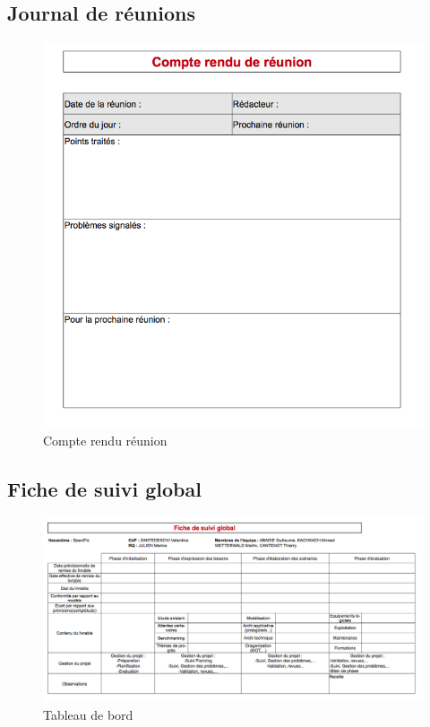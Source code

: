 \subsection{Journal de réunions}
\begin{figure}[h]
    \centering
    \includegraphics[width=140mm]{images/compte_rendu_reunion.png}
    \caption{Compte rendu réunion}
\end{figure}

\pagebreak
\begin{landscape}
\subsection{Fiche de suivi global}
\begin{figure}[h]
    \centering
    \includegraphics[width=220mm]{images/dashboard.png}
    \caption{Tableau de bord}
\end{figure}
\end{landscape}
